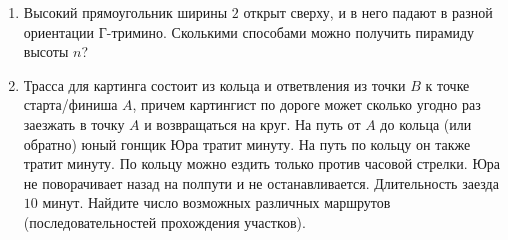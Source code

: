 \begin{enumerate}
\item Высокий прямоугольник ширины $2$ открыт сверху, и в него падают в разной ориентации Г-тримино.
  Сколькими способами можно получить пирамиду высоты $n$?

\item Трасса для картинга состоит из кольца и ответвления из точки $B$ к точке старта/финиша $A$,
 причем картингист по дороге может сколько угодно раз заезжать в точку $A$ и возвращаться на круг.
 На путь от $A$ до кольца (или обратно) юный гонщик Юра тратит минуту. На путь по кольцу он также
 тратит минуту. По кольцу можно ездить только против часовой стрелки. Юра не поворачивает назад на полпути и не останавливается. Длительность заезда $10$ минут. Найдите число возможных различных маршрутов (последовательностей прохождения участков).


\end{enumerate}
